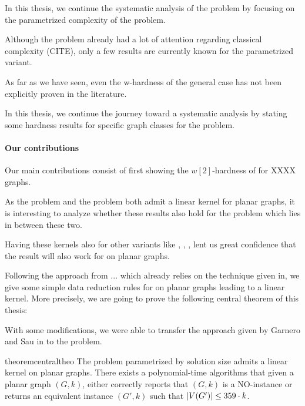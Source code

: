 In this thesis, we continue the systematic analysis of the \sdom problem by focusing on the parametrized complexity of the problem. 

Although the problem already had a lot of attention regarding classical complexity (CITE), only a few results are currently known for the parametrized variant. 

As far as we have seen, even the w-hardness of the general case has not been explicitly proven in the literature. 

In this thesis, we continue the journey toward a systematic analysis by stating some hardness results for specific graph classes for the problem.

\paragraph{Our contributions}

Our main contributions consist of first showing the $w[2]$-hardness of \sdom for XXXX graphs.

\noindent As the \dom problem and the \tdom problem both admit a linear kernel for planar graphs, it is interesting to analyze whether these results also hold for the \sdom problem which lies in between these two. 

Having these kernels also for other variants like \eddom, \efdom, \cdom, \rbdom lent us great confidence that the result will also work for \sdom on planar graphs.


Following the approach from ... which already relies on the technique given in, we give some simple data reduction rules for \sdom on planar graphs leading to a linear kernel. More precisely, we are going to prove the following central theorem of this thesis:

With some modifications, we were able to transfer the approach given by Garnero and Sau in \cite{Garnero2018} to the \sdom problem.

\begin{restatable}[]{theorem}{centraltheo}\label{thm:central}
    The \sdom problem parametrized by solution size admits a linear kernel on planar graphs. There exists a polynomial-time algorithms that given a planar graph $(G, k)$, either correctly reports that $(G, k)$ is a NO-instance or returns an equivalent instance $(G', k)$ such that $\abs{V(G')} \leq 359 \cdot k$.
\end{restatable}

